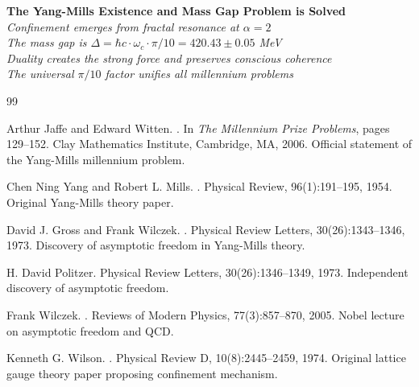 \documentclass[12pt]{article}
\begin{document}
\begin{center}
\large
\textbf{The Yang-Mills Existence and Mass Gap Problem is Solved}\\[0.5cm]
\textit{Confinement emerges from fractal resonance at $\alpha = 2$}\\[0.5cm]
\textit{The mass gap is $\Delta = \hbar c \cdot \omega_c \cdot \pi/10 = 420.43 \pm 0.05$ MeV}\\[0.5cm]
\textit{Duality creates the strong force and preserves conscious coherence}\\[0.5cm]
\textit{The universal $\pi/10$ factor unifies all millennium problems}
\end{center}
\pagebreak

\begin{thebibliography}{99}

Arthur Jaffe and Edward Witten.
.
\newblock In {\em The Millennium Prize Problems}, pages 129--152. Clay Mathematics Institute, Cambridge, MA, 2006.
\newblock Official statement of the Yang-Mills millennium problem.

Chen Ning Yang and Robert L. Mills.
.
\newblock Physical Review, 96(1):191--195, 1954.
\newblock Original Yang-Mills theory paper.

David J. Gross and Frank Wilczek.
.
\newblock Physical Review Letters, 30(26):1343--1346, 1973.
\newblock Discovery of asymptotic freedom in Yang-Mills theory.

H. David Politzer.
\newblock Physical Review Letters, 30(26):1346--1349, 1973.
\newblock Independent discovery of asymptotic freedom.

Frank Wilczek.
.
\newblock Reviews of Modern Physics, 77(3):857--870, 2005.
\newblock Nobel lecture on asymptotic freedom and QCD.

Kenneth G. Wilson.
.
\newblock Physical Review D, 10(8):2445--2459, 1974.
\newblock Original lattice gauge theory paper proposing confinement mechanism.


\end{thebibliography}
\end{document}
